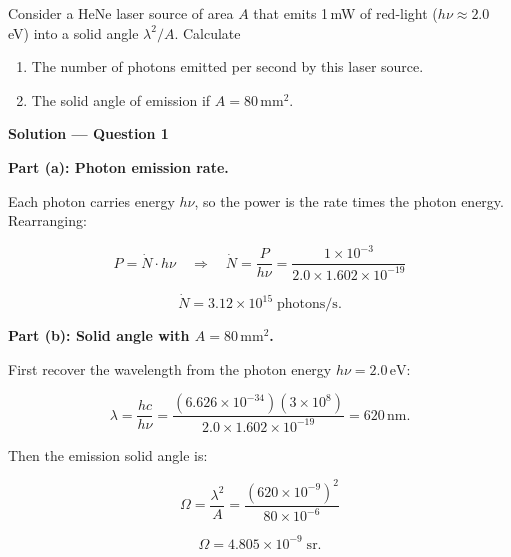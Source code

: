 
\begin{question}[Question 1]Consider a HeNe laser source of area $A$ that emits 1\,mW of red-light
($h\nu\approx 2.0$\,eV) into a solid angle $\lambda^{2}/A$. Calculate
\begin{enumerate}[label=(\alph*)]
  \item The number of photons emitted per second by this laser source.
  \item The solid angle of emission if $A=80$\,mm$^{2}$.
\end{enumerate}
\end{question}

\textbf{\large Solution --- Question 1}

\textbf{Part (a): Photon emission rate.}

Each photon carries energy $h\nu$, so the power is the rate times the photon energy. Rearranging:

\begin{equation*}
  P = \dot{N}\cdot h\nu
  \quad\Longrightarrow\quad
  \dot{N} = \frac{P}{h\nu} = \frac{1\times10^{-3}}{2.0\times1.602\times10^{-19}}
\end{equation*}

\begin{equation*}
  \boxed{\dot{N} = 3.12\times10^{15}\;\text{photons/s.}}
\end{equation*}

\textbf{Part (b): Solid angle with $A = 80\,\text{mm}^{2}$.}

First recover the wavelength from the photon energy $h\nu = 2.0\,\text{eV}$:

\begin{equation*}
  \lambda = \frac{hc}{h\nu} = \frac{(6.626\times10^{-34})(3\times10^{8})}{2.0\times1.602\times10^{-19}} = 620\,\text{nm}.
\end{equation*}

Then the emission solid angle is:

\begin{equation*}
  \Omega = \frac{\lambda^{2}}{A} = \frac{(620\times10^{-9})^{2}}{80\times10^{-6}}
\end{equation*}

\begin{equation*}
  \boxed{\Omega = 4.805\times10^{-9}\;\text{sr.}}
\end{equation*}

